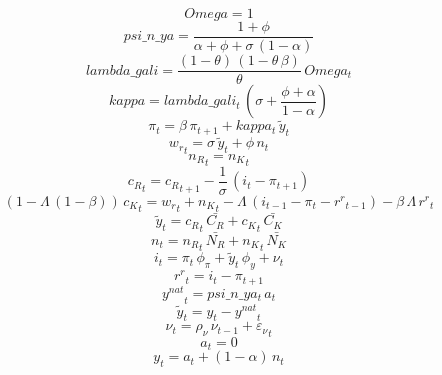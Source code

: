 \begin{dmath*}
Omega = 1
\end{dmath*}
\begin{dmath*}
psi\_n\_ya = \frac{1+{{\phi}}}{{{\alpha}}+{{\phi}}+{{\sigma}}\, \left(1-{{\alpha}}\right)}
\end{dmath*}
\begin{dmath*}
lambda\_gali = \frac{\left(1-{{\theta}}\right)\, \left(1-{{\theta}}\, {{\beta}}\right)}{{{\theta}}}\, {Omega_{t}}
\end{dmath*}
\begin{dmath*}
kappa = {lambda\_gali_{t}}\, \left({{\sigma}}+\frac{{{\phi}}+{{\alpha}}}{1-{{\alpha}}}\right)
\end{dmath*}
\begin{dmath}
{{\pi}_{t}}={{\beta}}\, {{\pi}_{t+1}}+{kappa_{t}}\, {{\tilde y}_{t}}
\end{dmath}
\begin{dmath}
{{w_r}_{t}}={{\sigma}}\, {{\tilde y}_{t}}+{{\phi}}\, {{n}_{t}}
\end{dmath}
\begin{dmath}
{{n_R}_{t}}={{n_K}_{t}}
\end{dmath}
\begin{dmath}
{{c_R}_{t}}={{c_R}_{t+1}}-\frac{1}{{{\sigma}}}\, \left({{i}_{t}}-{{\pi}_{t+1}}\right)
\end{dmath}
\begin{dmath}
\left(1-{{\Lambda}}\, \left(1-{{\beta}}\right)\right)\, {{c_K}_{t}}={{w_r}_{t}}+{{n_K}_{t}}-{{\Lambda}}\, \left({{i}_{t-1}}-{{\pi}_{t}}-{{r^r}_{t-1}}\right)-{{\beta}}\, {{\Lambda}}\, {{r^r}_{t}}
\end{dmath}
\begin{dmath}
{{\tilde y}_{t}}={{c_R}_{t}}\, {\bar{C_R}}+{{c_K}_{t}}\, {\bar{C_K}}
\end{dmath}
\begin{dmath}
{{n}_{t}}={{n_R}_{t}}\, {\bar{N_R}}+{{n_K}_{t}}\, {\bar{N_K}}
\end{dmath}
\begin{dmath}
{{i}_{t}}={{\pi}_{t}}\, {{\phi_{\pi}}}+{{\tilde y}_{t}}\, {{\phi_{y}}}+{{\nu}_{t}}
\end{dmath}
\begin{dmath}
{{r^r}_{t}}={{i}_{t}}-{{\pi}_{t+1}}
\end{dmath}
\begin{dmath}
{{y^{nat}}_{t}}={psi\_n\_ya_{t}}\, {{a}_{t}}
\end{dmath}
\begin{dmath}
{{\tilde y}_{t}}={{y}_{t}}-{{y^{nat}}_{t}}
\end{dmath}
\begin{dmath}
{{\nu}_{t}}={{\rho_{\nu}}}\, {{\nu}_{t-1}}+{{\varepsilon_\nu}_{t}}
\end{dmath}
\begin{dmath}
{{a}_{t}}=0
\end{dmath}
\begin{dmath}
{{y}_{t}}={{a}_{t}}+\left(1-{{\alpha}}\right)\, {{n}_{t}}
\end{dmath}
